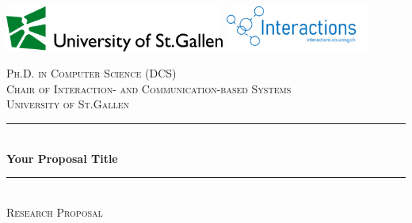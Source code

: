 \documentclass[a4paper,11pt]{article}
\begin{document}
\begin{titlepage}

\newcommand{\HRule}{\rule{\linewidth}{0.5mm}}
\setlength{\topmargin}{0in}
\center
\includegraphics[height=1.5cm]{logos/hsg.pdf}
\hfill
\includegraphics[height=1.5cm,trim=0 7mm 15mm 0]{logos/interactions.png}


\vfill
\textsc{\Large Ph.D. in Computer Science (DCS)} \\[0.5cm]
\textsc{\Large Chair of Interaction- and Communication-based Systems} \\[0.5cm]
\textsc{\LARGE University of St.Gallen}\\[2.0cm]


\HRule \\[0.6cm]
\huge \textbf{Your Proposal Title}\\[0.4cm]
\HRule \\[0.4cm]

\textsc{\Large Research Proposal}
\vfill



\end{titlepage}
\end{document}
